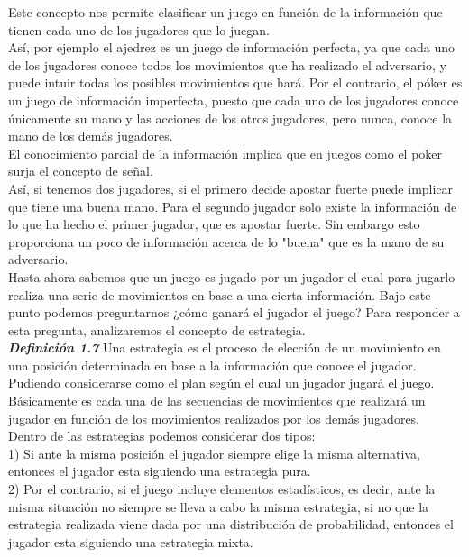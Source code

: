 \documentclass[10pt,a4paper]{book}
\begin{document}
Este concepto nos permite clasificar un juego en función de la información que tienen cada uno de los jugadores que lo juegan.\\
Así, por ejemplo el ajedrez es un juego de información perfecta, ya que cada uno de los jugadores conoce todos los movimientos que ha realizado el adversario, y puede intuir todas los posibles movimientos que hará. Por el contrario, el póker es un juego de información imperfecta, puesto que cada uno de los jugadores conoce únicamente su mano y las acciones de los otros jugadores, pero nunca, conoce la mano de los demás jugadores.\\
El conocimiento parcial de la información implica que en juegos como el poker surja el concepto de señal.\\
Así, si tenemos dos jugadores, si el primero decide apostar fuerte puede implicar que tiene una buena mano. Para el segundo jugador solo existe la información de lo que ha hecho el primer jugador, que es apostar fuerte. Sin embargo esto proporciona un poco de información acerca de lo "buena" que es la mano de su adversario.\\

Hasta ahora sabemos que un juego es jugado por un jugador el cual para jugarlo realiza una serie de movimientos en base a una cierta información. Bajo este punto podemos preguntarnos ¿cómo ganará el jugador el juego? Para responder a esta pregunta, analizaremos el concepto de estrategia.\\


\textit{\textbf{Definición 1.7}} Una estrategia es el proceso de elección de un movimiento en una posición determinada en base a la información que conoce el jugador. Pudiendo considerarse como el plan según el cual un jugador jugará el juego.\\ 

Básicamente es cada una de las secuencias de movimientos que realizará un jugador en función de los movimientos realizados por los demás jugadores.\\

Dentro de las estrategias podemos considerar dos tipos:\\

1)	Si ante la misma posición el jugador siempre elige la misma alternativa, entonces el jugador esta siguiendo una estrategia pura.\\

2)	Por el contrario, si el juego incluye elementos estadísticos, es decir, ante la misma situación no siempre se lleva a cabo la misma estrategia, si no que la estrategia realizada viene dada por una distribución de probabilidad, entonces el jugador esta siguiendo una estrategia mixta.\\
\end{document}
